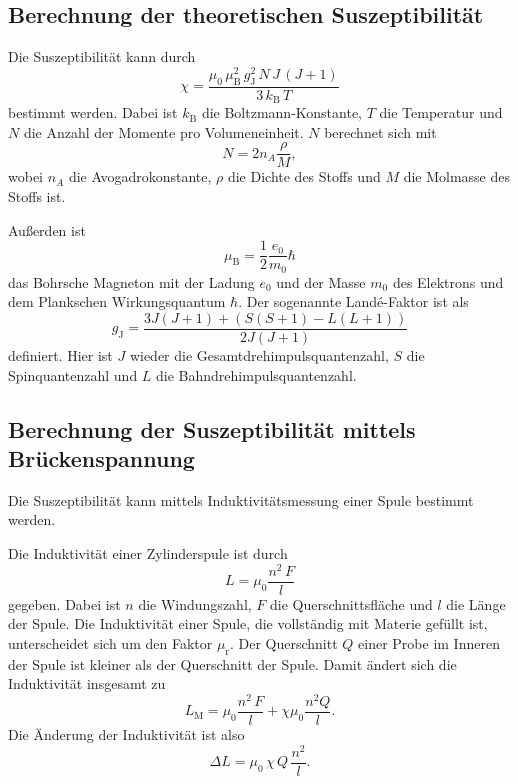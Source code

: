 \subsection{Berechnung der theoretischen Suszeptibilität}
Die Suszeptibilität kann durch 
\begin{equation}
    \chi = \frac{\mu_0 \, \mu_\text{B}^2 \, g_\text{J}^2 \, N \, J \, (J+1)}{3 \, k_\text{B} \, T}
    \label{eqn:chitheo}
\end{equation}
bestimmt werden.
Dabei ist $k_\text{B}$ die Boltzmann-Konstante, $T$ die Temperatur und $N$ die Anzahl der 
Momente pro Volumeneinheit.
$N$ berechnet sich mit 
\begin{equation}
    N = 2 n_A \frac{\rho}{M},
    \label{N}
\end{equation}
wobei $n_A$ die Avogadrokonstante, $\rho$ die Dichte des Stoffs und $M$ die Molmasse des Stoffs ist. 

\noindent Außerden ist
\begin{equation*}
    \mu_\text{B} = \frac{1}{2} \frac{e_0}{m_0} \hbar 
\end{equation*}
das Bohrsche Magneton mit der Ladung $e_0$ und der Masse $m_0$ des Elektrons und dem Plankschen 
Wirkungsquantum $\hbar$. Der sogenannte Landé-Faktor ist als 
\begin{equation*}
    g_\text{J}= \frac{3 J(J+1) + (S(S+1) - L(L+1))}{2J(J+1)}
\end{equation*}
definiert. Hier ist $J$ wieder die Gesamtdrehimpulsquantenzahl, $S$ die Spinquantenzahl und $L$ 
die Bahndrehimpulsquantenzahl.


\subsection{Berechnung der Suszeptibilität mittels Brückenspannung}
Die Suszeptibilität kann mittels Induktivitätsmessung einer Spule
bestimmt werden.

\noindent Die Induktivität einer Zylinderspule ist durch
\begin{equation*}
    L = \mu_0 \frac{n^2 \, F}{l}
\end{equation*}
gegeben.
Dabei ist $n$ die Windungszahl, $F$ die Querschnittsfläche und $l$ die Länge der Spule.
Die Induktivität einer Spule, die vollständig mit Materie gefüllt ist,
unterscheidet sich um den Faktor $\mu_\text{r}$.
Der Querschnitt $Q$ einer Probe im Inneren der Spule ist kleiner als der Querschnitt 
der Spule.
Damit ändert sich die Induktivität insgesamt zu 
\begin{equation*}
    L_\text{M}= \mu_0 \frac{n^2 \, F}{l} + \chi \mu_0 \frac{n^2 Q}{l}.
    \label{eqn:induktivität}
\end{equation*}
Die Änderung der Induktivität ist also %
\begin{equation*}
    \Delta L = \mu_0 \, \chi \, Q \, \frac{n^2}{l}.
\end{equation*}

